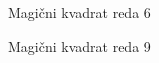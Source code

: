 \documentclass[a4paper,12pt]{article}
\begin{document}
Magični kvadrat reda 6

Magični kvadrat reda 9


\end{document}
